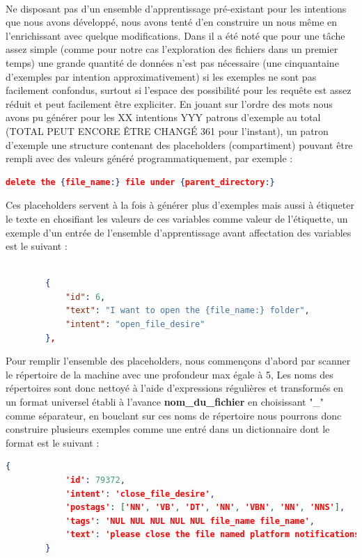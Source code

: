 		\paragraph{}
		Ne disposant pas d'un ensemble d'apprentissage pré-existant pour les intentions que nous avons développé, nous avons tenté d'en construire un nous même en l'enrichissant avec quelque modifications. Dans \cite{rasa_nlu} il a été noté que pour une tâche assez simple (comme pour notre cas l'exploration des fichiers dans un premier temps) une grande quantité de données n'est pas nécessaire (une cinquantaine d'exemples par intention approximativement) si les exemples ne sont pas facilement confondus, surtout si l'espace des possibilité pour les requête est assez réduit et peut facilement être expliciter. En jouant sur l'ordre des mots nous avons pu générer pour les XX intentions YYY patrons d'exemple au total (TOTAL PEUT ENCORE ÊTRE CHANGÉ 361 pour l'instant), un patron d'exemple une structure contenant des placeholders (compartiment) pouvant être rempli avec des valeurs généré programmatiquement, par exemple : 
		\begin{lstlisting}[language=json]
		delete the {file_name:} file under {parent_directory:}\end{lstlisting}
		Ces placeholders servent à la fois à générer plus d'exemples mais aussi à étiqueter le texte en chosifiant les valeurs de ces variables comme valeur de l'étiquette, un exemple d'un entrée de l'ensemble d'apprentissage avant affectation des variables est le suivant : 
		\begin{lstlisting}[language=json]
		
		{
			"id": 6,
			"text": "I want to open the {file_name:} folder",
			"intent": "open_file_desire"
		},
		\end{lstlisting}
		Pour remplir l'ensemble des placeholders, nous commençons d'abord par scanner le répertoire de la machine avec une profondeur max égale à 5,
		Les noms des répertoires sont donc nettoyé à l'aide d'expressions régulières et transformés en un format universel établi à l'avance \textbf{nom\_du\_fichier} en choisissant "\_" comme séparateur, en bouclant sur ces noms de répertoire nous pourrons donc construire plusieurs exemples comme une entré dans un dictionnaire dont le format est le suivant : 
		\begin{lstlisting}[language=json]
		{
			'id': 79372,
			'intent': 'close_file_desire',
			'postags': ['NN', 'VB', 'DT', 'NN', 'VBN', 'NN', 'NNS'],
			'tags': 'NUL NUL NUL NUL NUL file_name file_name',
			'text': 'please close the file named platform notifications'
		}
		\end{lstlisting}
